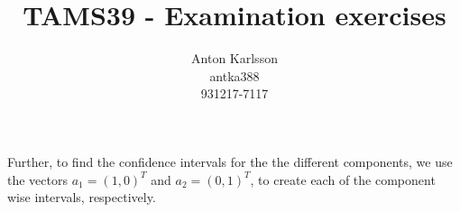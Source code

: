 \message{ !name(examination.tex)}\documentclass[two column]{report}
\title{TAMS39 - Examination exercises}
\author{Anton Karlsson\\antka388\\931217-7117}
\date{}
\begin{document}

Further, to find the confidence intervals for the the different
components, we use the vectors $a_1 = (1,0)^T$ and $a_2 = (0,1)^T$, to
create each of the component wise intervals, respectively. 

\end{document}
